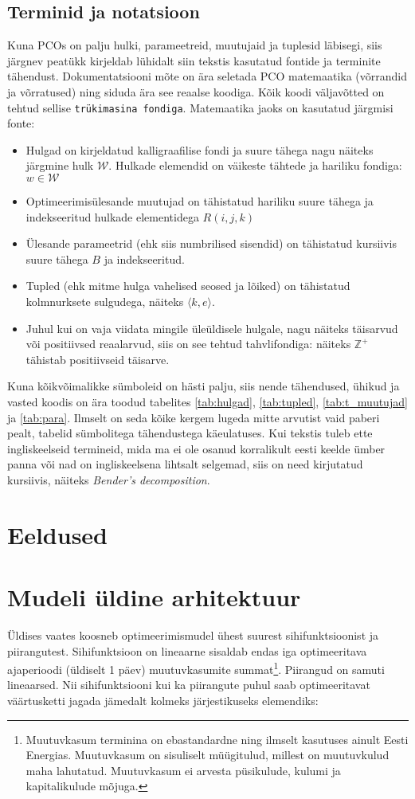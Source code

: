 \documentclass[10pt,a4paper]{article}
\begin{document}
\subsection{Terminid ja notatsioon}
Kuna PCOs on palju hulki, parameetreid, muutujaid ja tuplesid läbisegi, siis  järgnev peatükk kirjeldab lühidalt siin tekstis kasutatud fontide ja terminite tähendust. Dokumentatsiooni mõte on ära seletada PCO matemaatika (võrran\-did ja võrratused) ning siduda ära see reaalse koodiga. Kõik koodi väljavõtted on tehtud sellise \texttt{trükimasina fondiga}. Matemaatika jaoks on kasutatud järgmisi fonte:
\begin{itemize}
\item Hulgad on kirjeldatud kalligraafilise fondi ja suure tähega nagu näiteks järgmine hulk $\mathcal{W}$. Hulkade elemendid on väikeste tähtede ja hariliku fondiga: $w \in \mathcal{W}$
\item Optimeerimisülesande muutujad on tähistatud hariliku suure tähega ja indekseeritud hulkade elementidega $R(i,j,k)$
\item Ülesande parameetrid (ehk siis numbrilised sisendid) on tähistatud kursiivis suure tähega $\mathit{B}$ ja indekseeritud.
\item Tupled (ehk mitme hulga vahelised seosed ja lõiked) on tähistatud kolmnurksete sulgudega, näiteks $\langle k, e \rangle$.
\item Juhul kui on vaja viidata mingile üleüldisele hulgale, nagu näiteks täis\-arvud või positiivsed reaalarvud, siis on see tehtud tahvlifondiga: näiteks $\mathbb{Z}^+$ tähistab positiivseid täisarve.
\end{itemize}
Kuna kõikvõimalikke sümboleid on hästi palju, siis nende tähendused, ühikud ja vasted koodis on ära toodud tabelites \ref{tab:hulgad}, \ref{tab:tupled}, \ref{tab:t_muutujad} ja \ref{tab:para}. Ilmselt on seda kõike kergem lugeda mitte arvutist vaid paberi pealt, tabelid sümbolitega tähendustega käeulatuses.
Kui tekstis tuleb ette ingliskeelseid termineid, mida ma ei ole osanud korralikult eesti keelde ümber panna või nad on ingliskeelsena lihtsalt selgemad, siis on need kirjutatud kursiivis, näiteks \emph{Bender's decomposition}.

\section{Eeldused}
\section{Mudeli üldine arhitektuur}
Üldises vaates koosneb optimeerimismudel ühest suurest sihifunktsioonist ja piirangutest. Sihifunktsioon on lineaarne sisaldab endas iga optimeeritava ajaperioodi (üldiselt 1 päev) muutuvkasumite summat\footnote{Muutuvkasum terminina on ebastandardne ning ilmselt kasutuses ainult Eesti Energias. Muutuvkasum on sisuliselt müügitulud, millest on muutuvkulud maha lahutatud. Muutuvkasum ei arvesta püsikulude, kulumi ja kapitalikulude mõjuga.}. Piirangud on samuti lineaarsed. Nii sihifunktsiooni kui ka piirangute puhul saab optimeeritavat väärtusketti jagada jämedalt kolmeks järjestikuseks elemendiks:
\end{document}
